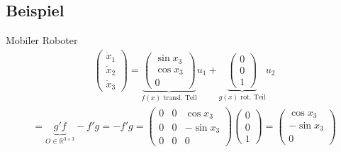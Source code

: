 \documentclass[ngerman]{tudscrreprt}
\begin{document}
\subsection*{Beispiel} Mobiler Roboter
\begin{align*}
\begin{pmatrix}
\dot x_1\\ \dot x_2\\ \dot x_3 
\end{pmatrix} = 
\underbrace{
\begin{pmatrix}
\sin{x_3}\\ \cos{x_3}\\ 0 
\end{pmatrix}}_{f(x) \text{ transl. Teil}} u_1 + \underbrace{
\begin{pmatrix} 0\\ 0\\ 1 
\end{pmatrix}}_{g(x)\text{ rot. Teil}} u_2
\end{align*}
\begin{align*}
[f,g]= \underbrace{g'f}_{O \in \mathbb{R}^{3\times 3}} - f'g = -f'g = \begin{pmatrix} 0 & 0 & \cos{x_3}\\ 0&0&-\sin{x_3}\\ 0&0&0\end{pmatrix} \begin{pmatrix} 0\\ 0\\ 1\end{pmatrix} = \begin{pmatrix} \cos{x_3}\\ -\sin{x_3}\\ 0 \end{pmatrix}
\end{align*}
\end{document}
